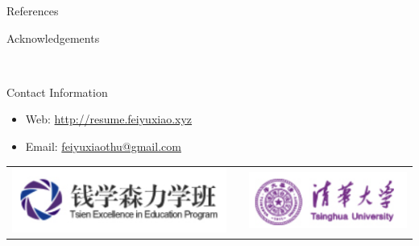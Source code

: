 \documentclass[final]{beamer}
\newlength{\onecolwid}
\begin{document}
\begin{frame}[t]
\begin{columns}[t]
\begin{column}{\onecolwid}
\begin{block}{References}

\nocite{*} %
\small{
\vspace{0.75in}}

\end{block}




\begin{block}{Acknowledgements}

\small{} \\
\end{block}



\begin{alertblock}{Contact Information}

\begin{itemize}
\item Web: \href{http://resume.feiyuxiao.xyz/}{http://resume.feiyuxiao.xyz}
\item Email: \href{feiyuxiaothu@gmail.com}{feiyuxiaothu@gmail.com}
\end{itemize}

\end{alertblock}

\begin{center}
\begin{tabular}{ccc}
\includegraphics[width=0.5\linewidth]{logo.png} & \hfill & \includegraphics[width=0.5\linewidth]{Tsinghua.png}
\end{tabular}
\end{center}


\end{column}
\end{columns}
\end{frame}
\end{document}
